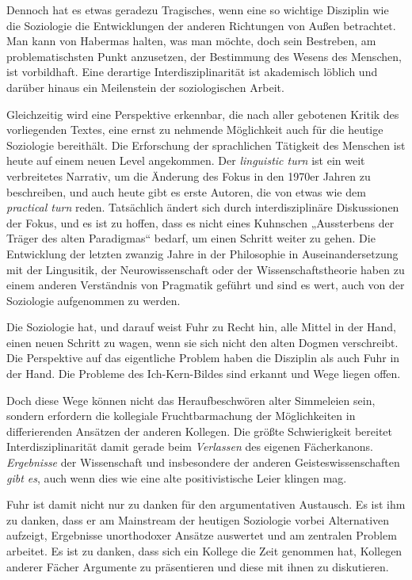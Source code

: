 \documentclass[12pt,a4paper]{article}
\begin{document}
Dennoch hat es etwas geradezu Tragisches, wenn eine so wichtige Disziplin wie
die Soziologie die Entwicklungen der anderen Richtungen von Außen betrachtet.
Man kann von Habermas halten, was man möchte, doch sein Bestreben, am
problematischsten Punkt anzusetzen, der Bestimmung des Wesens des Menschen, ist
vorbildhaft. Eine derartige Interdisziplinarität ist akademisch löblich und
darüber hinaus ein Meilenstein der soziologischen Arbeit.

Gleichzeitig wird eine Perspektive erkennbar, die nach aller gebotenen Kritik
des vorliegenden Textes, eine ernst zu nehmende Möglichkeit auch für die
heutige Soziologie bereithält. Die Erforschung der sprachlichen Tätigkeit des
Menschen ist heute auf einem neuen Level angekommen. Der \emph{linguistic turn}
ist ein weit verbreitetes Narrativ, um die Änderung des Fokus in den 1970er
Jahren zu beschreiben, und auch heute gibt es erste Autoren, die von etwas wie
dem \emph{practical turn} reden. Tatsächlich ändert sich durch
interdisziplinäre Diskussionen der Fokus, und es ist zu hoffen, dass es nicht
eines Kuhnschen „Aussterbens der Träger des alten Paradigmas“ bedarf, um einen
Schritt weiter zu gehen. Die Entwicklung der letzten zwanzig Jahre in der
Philosophie in Auseinandersetzung mit der Lingusitik, der Neurowissenschaft
oder der Wissenschaftstheorie haben zu einem anderen Verständnis von Pragmatik
geführt und sind es wert, auch von der Soziologie aufgenommen zu werden.
\clearpage

Die Soziologie hat, und darauf weist Fuhr zu Recht hin, alle Mittel in der
Hand, einen neuen Schritt zu wagen, wenn sie sich nicht den alten Dogmen
verschreibt. Die Perspektive auf das eigentliche Problem haben die Disziplin
als auch Fuhr in der Hand. Die Probleme des Ich-Kern-Bildes sind erkannt und
Wege liegen offen.

Doch diese Wege können nicht das Heraufbeschwören alter Simmeleien sein,
sondern erfordern die kollegiale Fruchtbarmachung der Möglichkeiten in
differierenden Ansätzen der anderen Kollegen. Die größte Schwierigkeit bereitet
Interdisziplinarität damit gerade beim \emph{Verlassen} des eigenen
Fächerkanons.  \emph{Ergebnisse} der Wissenschaft und insbesondere der anderen
Geisteswissenschaften \emph{gibt es}, auch wenn dies wie eine alte
positivistische Leier klingen mag.

Fuhr ist damit nicht nur zu danken für den argumentativen Austausch. Es ist ihm
zu danken, dass er am Mainstream der heutigen Soziologie vorbei Alternativen
aufzeigt, Ergebnisse unorthodoxer Ansätze auswertet und am zentralen Problem
arbeitet. Es ist zu danken, dass sich ein Kollege die Zeit genommen hat,
Kollegen anderer Fächer Argumente zu präsentieren und diese mit ihnen zu
diskutieren.
\end{document}
